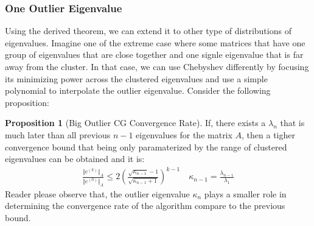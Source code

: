 \documentclass[]{article}
\theoremstyle{definition}
\newtheorem{prop}{Proposition}[section]  %
\begin{document}
        \subsubsection{One Outlier Eigenvalue}
            Using the derived theorem, we can extend it to other type of distributions of eigenvalues. Imagine one of the extreme case where some matrices that have one group of eigenvalues that are close together and one signle eigenvalue that is far away from the cluster. In that case, we can use Chebyshev differently by focusing its minimizing power across the clustered eigenvalues and use a simple polynomial to interpolate the outlier eigenvalue. Consider the following proposition: 
            \begin{prop}[Big Outlier CG Convergence Rate]
                If, there exists a $\lambda_n$ that is much later than all previous $n - 1$ eigenvalues for the matrix $A$, then a tigher convergence bound that being only paramaterized by the range of clustered eigenvalues can be obtained and it is: 
                \begin{align}
                    \frac{\Vert e^{(k)}\Vert_A}{\Vert e^{(0)}\Vert_A} \le 
                    2 \left(
                        \frac{\sqrt{\kappa_{n - 1}} - 1}{\sqrt{\kappa_{n - 1} + 1}}
                    \right)^{k - 1}\quad 
                    \kappa_{n - 1} =  \frac{\lambda_{n - 1}}{\lambda_1}
                \end{align}
                Reader please observe that, the outlier eigenvalue $\kappa_n$ plays a smaller role in determining the convergence rate of the algorithm compare to the previous bound. 
            \end{prop}
\end{document}
